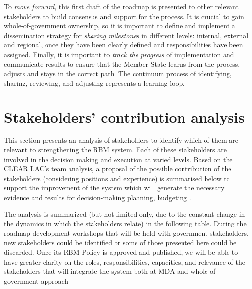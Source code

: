 \documentclass[
  10pt,
]{book}
\begin{document}
To \emph{move forward}, this first draft of the roadmap is presented to other relevant stakeholders to build consensus and support for the process. It is crucial to gain whole-of-government ownership, so it is important to define and implement a dissemination strategy for \emph{sharing milestones} in different levels: internal, external and regional, once they have been clearly defined and responsibilities have been assigned. Finally, it is important to \emph{track the progress} of implementation and communicate results to ensure that the Member State learns from the process, adjusts and stays in the correct path. The continuum process of identifying, sharing, reviewing, and adjusting represents a learning loop.

\hypertarget{stakeholders-contribution-analysis}{%
\section{Stakeholders' contribution analysis}\label{stakeholders-contribution-analysis}}

This section presents an analysis of stakeholders to identify which of them are relevant to strengthening the RBM system. Each of these stakeholders are involved in the decision making and execution at varied levels. Based on the CLEAR LAC's team analysis, a proposal of the possible contribution of the stakeholders (considering positions and experience) is summarised below to support the improvement of the system which will generate the necessary evidence and results for decision-making planning, budgeting .

The analysis is summarized (but not limited only, due to the constant change in the dynamics in which the stakeholders relate) in the following table. During the roadmap development workshops that will be held with government stakeholders, new stakeholders could be identified or some of those presented here could be discarded. Once its RBM Policy is approved and published, we will be able to have greater clarity on the roles, responsibilities, capacities, and relevance of the stakeholders that will integrate the system both at MDA and whole-of-government approach.
\end{document}
